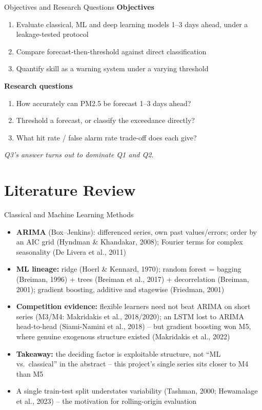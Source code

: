 \documentclass[12pt,aspectratio=169]{beamer}
\begin{document}
\begin{frame}{Objectives and Research Questions}
  \textbf{Objectives}
  \begin{enumerate}
    \item Evaluate classical, ML and deep learning models 1--3 days ahead,
      under a leakage-tested protocol
    \item Compare forecast-then-threshold against direct classification
    \item Quantify skill as a warning system under a varying threshold
  \end{enumerate}
  \textbf{Research questions}
  \begin{enumerate}
    \item How accurately can PM2.5 be forecast 1--3 days ahead?
    \item Threshold a forecast, or classify the exceedance directly?
    \item What hit rate / false alarm rate trade-off does each give?
  \end{enumerate}
  \centering\textit{Q3's answer turns out to dominate Q1 and Q2.}
\end{frame}

\section{Literature Review}

\begin{frame}{Classical and Machine Learning Methods}
  \begin{itemize}
    \item \textbf{ARIMA} (Box--Jenkins): differenced series, own past
      values/errors; order by an AIC grid (Hyndman \& Khandakar, 2008);
      Fourier terms for complex seasonality (De Livera et al., 2011)
    \item \textbf{ML lineage:} ridge (Hoerl \& Kennard, 1970); random
      forest = bagging (Breiman, 1996) + trees (Breiman et al., 2017) +
      decorrelation (Breiman, 2001); gradient boosting, additive and
      stagewise (Friedman, 2001)
    \item \textbf{Competition evidence:} flexible learners need not beat
      ARIMA on short series (M3/M4: Makridakis et al., 2018/2020); an
      LSTM lost to ARIMA head-to-head (Siami-Namini et al., 2018) -- but
      gradient boosting won M5, where genuine exogenous structure existed
      (Makridakis et al., 2022)
    \item \textbf{Takeaway:} the deciding factor is exploitable
      structure, not ``ML vs.\ classical'' in the abstract -- this
      project's single series sits closer to M4 than M5
    \item A single train-test split understates variability (Tashman,
      2000; Hewamalage et al., 2023) -- the motivation for rolling-origin
      evaluation
  \end{itemize}
\end{frame}
\end{document}
